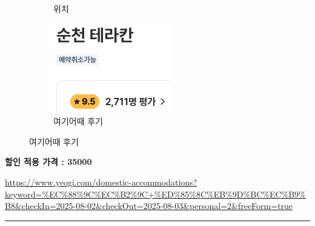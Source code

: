 \documentclass[10pt]{article}
\begin{document}
\begin{figure}[htbp]
\begin{subfigure}{0.3\textwidth}
    \caption{위치}
    \label{fig:2}
  \end{subfigure}
  \hfill
  \begin{subfigure}{0.3\textwidth}
    \centering
    \includegraphics[width=\linewidth]{fig/순천테라칸_후기.png}
    \caption{여기어때 후기}
    \label{fig:3}
  \end{subfigure}
  \label{fig:three}
\end{figure}
\begin{center}
\textbf{할인 적용 가격 : 35000}
\end{center}
\url{https://www.yeogi.com/domestic-accommodations?keyword=%EC%88%9C%EC%B2%9C+%ED%85%8C%EB%9D%BC%EC%B9%B8&checkIn=2025-08-02&checkOut=2025-08-03&personal=2&freeForm=true}

\bigskip      %
\hrule        %
\bigskip
\end{document}

